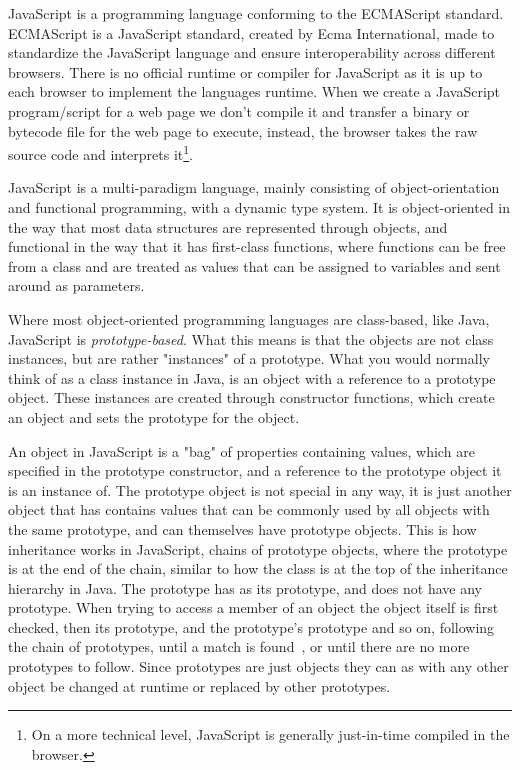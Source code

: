 JavaScript is a programming language conforming to the ECMAScript standard.
ECMAScript is a JavaScript standard, created by Ecma International, made to standardize the JavaScript language and ensure interoperability across different browsers.
There is no official runtime or compiler for JavaScript as it is up to each browser to implement the languages runtime.
When we create a JavaScript program/script for a web page we don't compile it and transfer a binary or bytecode file for the web page to execute, instead, the browser takes the raw source code and interprets it\footnote{On a more technical level, JavaScript is generally just-in-time compiled in the browser.}.

JavaScript is a multi-paradigm language, mainly consisting of object-orientation and functional programming, with a dynamic type system.
It is object-oriented in the way that most data structures are represented through objects, and functional in the way that it has first-class functions, where functions can be free from a class and are treated as values that can be assigned to variables and sent around as parameters.

Where most object-oriented programming languages are class-based, like Java, JavaScript is \textit{prototype-based}.
What this means is that the objects are not class instances, but are rather "instances" of a prototype.
What you would normally think of as a class instance in Java, is an object with a reference to a prototype object.
These instances are created through constructor functions, which create an object and sets the prototype for the object.

An object in JavaScript is a "bag" of properties containing values, which are specified in the prototype constructor, and a reference to the prototype object it is an instance of.
The prototype object is not special in any way, it is just another object that has contains values that can be commonly used by all objects with the same prototype, and can themselves have prototype objects.
This is how inheritance works in JavaScript, chains of prototype objects, where the  prototype is at the end of the chain, similar to how the  class is at the top of the inheritance hierarchy in Java.
The  prototype has  as its prototype, and  does not have any prototype.
When trying to access a member of an object the object itself is first checked, then its prototype, and the prototype's prototype and so on, following the chain of prototypes, until a match is found~\cite{prototypechaining}, or until there are no more prototypes to follow.
Since prototypes are just objects they can as with any other object be changed at runtime or replaced by other prototypes.

